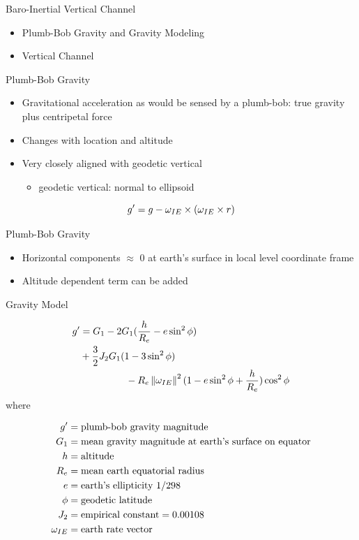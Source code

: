 \documentclass{beamer}
\begin{document}
\begin{frame}
Baro-Inertial Vertical Channel
\begin{itemize}
  \item Plumb-Bob Gravity and Gravity Modeling
  \item Vertical Channel
\end{itemize} 
\end{frame}

\begin{frame}
Plumb-Bob Gravity
\begin{itemize}
  \item Gravitational acceleration as would be sensed by a plumb-bob: true gravity plus centripetal force
  \item Changes with location and altitude
  \item Very closely aligned with geodetic vertical
  \begin{itemize}
    \item geodetic vertical: normal to ellipsoid
  \end{itemize} 
\end{itemize} 
\[g'=g-\omega_{IE}\times(\omega_{IE}\times r)\]
\end{frame}

\begin{frame}
Plumb-Bob Gravity
\begin{itemize}
  \item Horizontal components $\approx$ 0 at earth's surface in local level coordinate frame
  \item Altitude dependent term can be added 
\end{itemize} 
\end{frame}


\begin{frame}
Gravity Model

\begin{eqnarray}
 g'&= G_1 - 2G_1(\dfrac{h}{R_e} - e \sin^2\phi  )\\
& +\dfrac{3}{2}J_2G_1(1-3\sin^2\phi)\nonumber\\
& \;\;\;\;\;\;\;\;\;\;\;\;\;\;\;\;\; - R_e\left\Vert\omega_{IE}\right\Vert^2(1-e\sin^2\phi+\dfrac{h}{R_e})\cos^2\phi \nonumber
\end{eqnarray}
where
\begin{tiny}
\begin{align*}
g' &= \text{plumb-bob gravity magnitude}\\
G_1&= \text{mean gravity magnitude at earth's surface on equator}\\
h  &= \text{altitude}\\
R_e&= \text{mean earth equatorial radius}\\
e  &= \text{earth's ellipticity 1/298}\\
\phi&= \text{geodetic latitude}\\
J_2&= \text{empirical constant}=0.00108\\
\omega_{IE}&= \text{earth rate vector}
\end{align*}
\end{tiny}
\end{frame}
\end{document}

